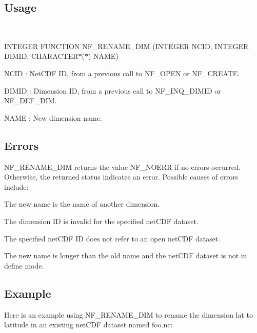 \subsection*{Usage }

 

I\+N\+T\+E\+G\+ER F\+U\+N\+C\+T\+I\+ON N\+F\+\_\+\+R\+E\+N\+A\+M\+E\+\_\+\+D\+IM (I\+N\+T\+E\+G\+ER N\+C\+ID, I\+N\+T\+E\+G\+ER D\+I\+M\+ID, C\+H\+A\+R\+A\+C\+T\+E\+R$\ast$($\ast$) N\+A\+ME)

{\ttfamily N\+C\+ID} \+: Net\+C\+DF ID, from a previous call to N\+F\+\_\+\+O\+P\+EN or N\+F\+\_\+\+C\+R\+E\+A\+TE.

{\ttfamily D\+I\+M\+ID} \+: Dimension ID, from a previous call to N\+F\+\_\+\+I\+N\+Q\+\_\+\+D\+I\+M\+ID or N\+F\+\_\+\+D\+E\+F\+\_\+\+D\+IM.

{\ttfamily N\+A\+ME} \+: New dimension name.

\subsection*{Errors }

N\+F\+\_\+\+R\+E\+N\+A\+M\+E\+\_\+\+D\+IM returns the value N\+F\+\_\+\+N\+O\+E\+RR if no errors occurred. Otherwise, the returned status indicates an error. Possible causes of errors include\+:


\begin{DoxyItemize}
\item The new name is the name of another dimension.
\item The dimension ID is invalid for the specified net\+C\+DF dataset.
\item The specified net\+C\+DF ID does not refer to an open net\+C\+DF dataset.
\item The new name is longer than the old name and the net\+C\+DF dataset is not in define mode.
\end{DoxyItemize}

\subsection*{Example }

Here is an example using N\+F\+\_\+\+R\+E\+N\+A\+M\+E\+\_\+\+D\+IM to rename the dimension lat to latitude in an existing net\+C\+DF dataset named foo.\+nc\+:

 


